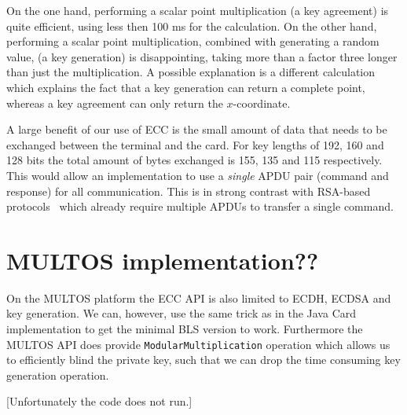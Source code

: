 On the one hand, performing a scalar point multiplication (a key agreement) is
quite efficient, using less then 100 ms for the calculation. On the other hand,
performing a scalar point multiplication, combined with generating a random
value, (a key generation) is disappointing, taking more than a factor three
longer than just the multiplication. A possible explanation is a different
calculation which explains the fact that a key generation can return a complete
point, whereas a key agreement can only return the $x$-coordinate.

A large benefit of our use of ECC is the small amount of data that needs to be
exchanged between the terminal and the card. For key lengths of 192, 160 and 128
bits the total amount of bytes exchanged is 155, 135 and 115 respectively. This
would allow an implementation to use a \emph{single} APDU pair (command and
response) for all communication. This is in strong contrast with RSA-based
protocols~\cite{Sterckx09,TewsJacobs09} which already require multiple APDUs to
transfer a single command.

\section{MULTOS implementation??}

On the MULTOS platform the ECC API is also limited to ECDH, ECDSA and key
generation. We can, however, use the same trick as in the Java Card
implementation to get the minimal BLS version to work. Furthermore the MULTOS
API does provide \texttt{ModularMultiplication} operation which allows us to
efficiently blind the private key, such that we can drop the time consuming key
generation operation.

[Unfortunately the code does not run.]